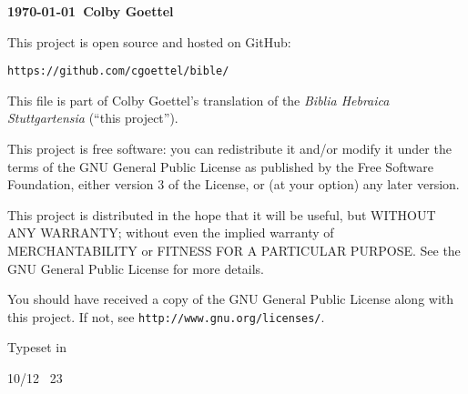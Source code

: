 {\small
\vfill

\textbf{\textcopyleft\thinspace\justtheyear\today\ Colby Goettel}

\vfill

{\noindent This project is open source and hosted on GitHub:}
\begin{center}
    \texttt{https://github.com/cgoettel/bible/}
\end{center}

\vfill

This file is part of Colby Goettel's translation of the \emph{Biblia Hebraica Stuttgartensia} (``this project'').

This project is free software: you can redistribute it and/or modify it under the terms of the GNU General Public License as published by the Free Software Foundation, either version 3 of the License, or (at your option) any later version.

This project is distributed in the hope that it will be useful, but WITHOUT ANY WARRANTY; without even the implied warranty of MERCHANTABILITY or FITNESS FOR A PARTICULAR PURPOSE.  See the GNU General Public License for more details.

You should have received a copy of the GNU General Public License along with this project. If not, see \texttt{http://www.gnu.org/licenses/}.

\vfill

Typeset in \XeTeX

10/12 \texttimes\ 23
}
